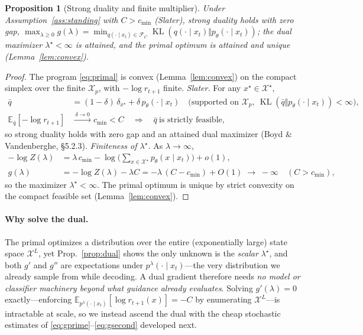\documentclass{article}
\newtheorem{proposition}{Proposition}
\DeclareMathOperator{\KL}{KL}
\newcommand{\E}{\mathbb{E}}
\newcommand{\X}{\mathcal{X}}
\newcommand{\lstar}{\lambda^{\star}}
\newcommand{\qlam}{p^{\lambda}(\cdot\mid x_t)}
\begin{document}
\begin{proposition}[Strong duality and finite multiplier]
\label{prop:strongduality}
Under Assumption~\ref{ass:standing} with $C>c_{\min}$ (Slater), strong duality holds with zero gap, $\max_{\lambda\ge0}g(\lambda)=\min_{q(\cdot\mid x_t)\in\mathcal F_C}\KL(q(\cdot\mid x_t)\Vert p_\theta(\cdot\mid x_t))$; the dual maximizer $\lstar<\infty$ is attained, and the primal optimum is attained and unique (Lemma~\ref{lem:convex}).
\end{proposition}
\begin{proof}
The program \eqref{eq:primal} is convex (Lemma~\ref{lem:convex}) on the compact simplex over the finite $\X_p$, with $-\log r_{t+1}$ finite. \emph{Slater.} For any $x^\star\in\X^\star$,
\begin{align*}
\bar q&=(1-\delta)\,\delta_{x^\star}+\delta\,p_\theta(\cdot\mid x_t)
  \quad\big(\text{supported on }\X_p,\ \KL(\bar q\Vert p_\theta(\cdot\mid x_t))<\infty\big),\\
\E_{\bar q}[-\log r_{t+1}]&\xrightarrow{\ \delta\to0\ }c_{\min}<C
  \quad\Longrightarrow\quad \bar q\ \text{is strictly feasible},
\end{align*}
so strong duality holds with zero gap and an attained dual maximizer (Boyd \& Vandenberghe, \S5.2.3). \emph{Finiteness of $\lstar$.} As $\lambda\to\infty$,
\begin{align*}
-\log Z(\lambda)&=\lambda\,c_{\min}-\log\!\Big(\sum_{x\in\X^\star}p_\theta(x\mid x_t)\Big)+o(1),\\
g(\lambda)&=-\log Z(\lambda)-\lambda C=-\lambda\,(C-c_{\min})+O(1)\;\longrightarrow\;-\infty\quad(C>c_{\min}),
\end{align*}
so the maximizer $\lstar<\infty$. The primal optimum is unique by strict convexity on the compact feasible set (Lemma~\ref{lem:convex}).
\end{proof}

\paragraph{Why solve the dual.} The primal optimizes a distribution over the entire (exponentially large) state space $\X^L$, yet Prop.~\ref{prop:dual} shows the only unknown is the \emph{scalar} $\lstar$, and both $g'$ and $g''$ are expectations under $\qlam$---the very distribution we already sample from while decoding. A dual gradient therefore needs \emph{no model or classifier machinery beyond what guidance already evaluates}. Solving $g'(\lambda)=0$ exactly---enforcing $\E_{p^{\lambda}(\cdot\mid x_t)}[\log r_{t+1}(x)]=-C$ by enumerating $\X^L$---is intractable at scale, so we instead ascend the dual with the cheap stochastic estimates of \eqref{eq:gprime}--\eqref{eq:gsecond} developed next.
\end{document}
